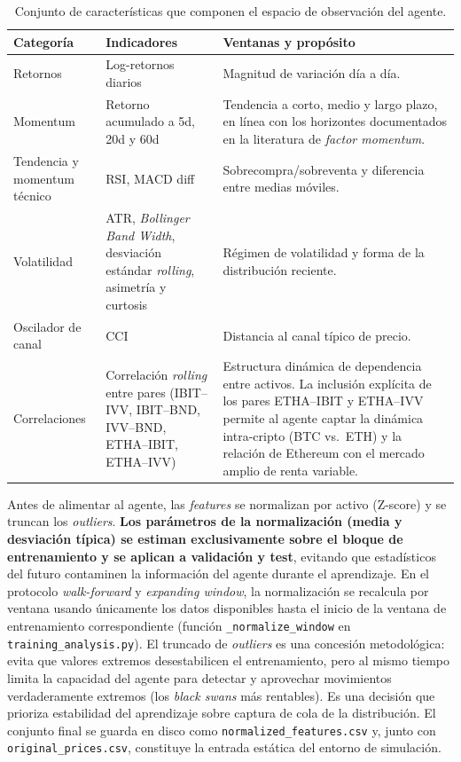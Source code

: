 \documentclass[IB,a4paper]{TFUOC}
\begin{document}
\begin{table}[h]
\centering
\renewcommand{\arraystretch}{1.25}
\begin{tabular}{|p{3.0cm}|p{3.7cm}|p{6.3cm}|}
\hline
\textbf{Categoría} & \textbf{Indicadores} & \textbf{Ventanas y propósito} \\ \hline
Retornos & Log-retornos diarios & Magnitud de variación día a día. \\ \hline
Momentum & Retorno acumulado a 5d, 20d y 60d & Tendencia a corto, medio y largo plazo, en línea con los horizontes documentados en la literatura de \textit{factor momentum}. \\ \hline
Tendencia y momentum técnico & RSI, MACD diff & Sobrecompra/sobreventa y diferencia entre medias móviles. \\ \hline
Volatilidad & ATR, \textit{Bollinger Band Width}, desviación estándar \textit{rolling}, asimetría y curtosis & Régimen de volatilidad y forma de la distribución reciente. \\ \hline
Oscilador de canal & CCI & Distancia al canal típico de precio. \\ \hline
Correlaciones & Correlación \textit{rolling} entre pares (IBIT--IVV, IBIT--BND, IVV--BND, ETHA--IBIT, ETHA--IVV) & Estructura dinámica de dependencia entre activos. La inclusión explícita de los pares ETHA--IBIT y ETHA--IVV permite al agente captar la dinámica intra-cripto (BTC vs.\ ETH) y la relación de Ethereum con el mercado amplio de renta variable. \\ \hline
\end{tabular}
\caption{Conjunto de características que componen el espacio de observación del agente.}
\label{tab:features}
\end{table}

Antes de alimentar al agente, las \textit{features} se normalizan por activo (Z-score) y se truncan los \textit{outliers}. \textbf{Los parámetros de la normalización (media y desviación típica) se estiman exclusivamente sobre el bloque de entrenamiento y se aplican a validación y test}, evitando que estadísticos del futuro contaminen la información del agente durante el aprendizaje. En el protocolo \textit{walk-forward} y \textit{expanding window}, la normalización se recalcula por ventana usando únicamente los datos disponibles hasta el inicio de la ventana de entrenamiento correspondiente (función \texttt{\_normalize\_window} en \texttt{training\_analysis.py}). El truncado de \textit{outliers} es una concesión metodológica: evita que valores extremos desestabilicen el entrenamiento, pero al mismo tiempo limita la capacidad del agente para detectar y aprovechar movimientos verdaderamente extremos (los \textit{black swans} más rentables). Es una decisión que prioriza estabilidad del aprendizaje sobre captura de cola de la distribución. El conjunto final se guarda en disco como \texttt{normalized\_features.csv} y, junto con \texttt{original\_prices.csv}, constituye la entrada estática del entorno de simulación.
\end{document}
